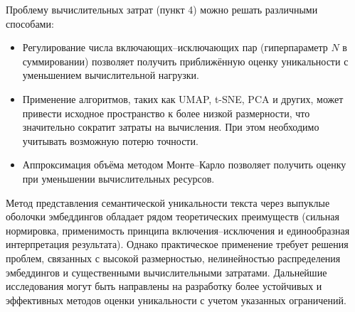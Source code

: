 Проблему вычислительных затрат (пункт 4) можно решать различными способами:

\begin{itemize}
    \item Регулирование числа включающих–исключающих пар (гиперпараметр $N$ в суммировании)
    позволяет получить приближённую оценку уникальности с уменьшением вычислительной нагрузки.
    \item Применение алгоритмов, таких как UMAP, t-SNE, PCA и других, может привести исходное пространство
    к более низкой размерности, что значительно сократит затраты на вычисления. При этом необходимо учитывать возможную потерю точности.
    \item Аппроксимация объёма методом Монте–Карло позволяет получить оценку при уменьшении вычислительных ресурсов.
\end{itemize}

Метод представления семантической уникальности текста через выпуклые оболочки эмбеддингов обладает рядом
теоретических преимуществ (сильная нормировка, применимость принципа включения–исключения и единообразная
интерпретация результата). Однако практическое применение требует решения проблем, связанных с высокой размерностью,
нелинейностью распределения эмбеддингов и существенными вычислительными затратами. Дальнейшие исследования
могут быть направлены на разработку более устойчивых и эффективных методов оценки уникальности с учетом
указанных ограничений.